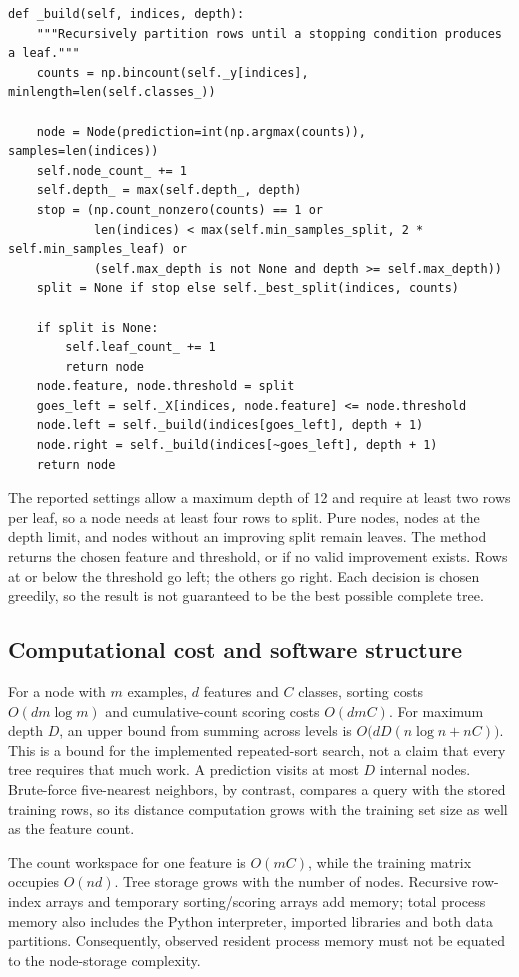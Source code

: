 \documentclass[11pt,letterpaper]{article}
\newcommand{\code}[1]{\texttt{\detokenize{#1}}}
\begin{document}
\begingroup\scriptsize
\begin{verbatim}
def _build(self, indices, depth):
    """Recursively partition rows until a stopping condition produces a leaf."""
    counts = np.bincount(self._y[indices], minlength=len(self.classes_))
    
    node = Node(prediction=int(np.argmax(counts)), samples=len(indices))
    self.node_count_ += 1
    self.depth_ = max(self.depth_, depth)
    stop = (np.count_nonzero(counts) == 1 or
            len(indices) < max(self.min_samples_split, 2 * self.min_samples_leaf) or
            (self.max_depth is not None and depth >= self.max_depth))
    split = None if stop else self._best_split(indices, counts)
    
    if split is None:
        self.leaf_count_ += 1
        return node
    node.feature, node.threshold = split
    goes_left = self._X[indices, node.feature] <= node.threshold
    node.left = self._build(indices[goes_left], depth + 1)
    node.right = self._build(indices[~goes_left], depth + 1)
    return node
\end{verbatim}
\endgroup

The reported settings allow a maximum depth of 12 and require at least two
rows per leaf, so a node needs at least four rows to split. Pure nodes,
nodes at the depth limit, and nodes without an improving split remain leaves.
The \code{_best_split} method returns the chosen feature and threshold, or
\code{None} if no valid improvement exists. Rows at or below the threshold
go left; the others go right. Each decision is chosen greedily, so the
result is not guaranteed to be the best possible complete tree.

\subsection{Computational cost and software structure}
For a node with $m$ examples, $d$ features and $C$ classes, sorting costs
$O(dm\log m)$ and cumulative-count scoring costs $O(dmC)$. For maximum depth
$D$, an upper bound from summing across levels is
$O\bigl(dD(n\log n+nC)\bigr)$. This is a bound for the implemented repeated-sort
search, not a claim that every tree requires that much work. A prediction visits
at most $D$ internal nodes. Brute-force five-nearest neighbors, by contrast, compares a query with
the stored training rows, so its distance computation grows with the training
set size as well as the feature count.

The count workspace for one feature is $O(mC)$, while the training matrix occupies
$O(nd)$. Tree storage grows with the number of nodes. Recursive row-index arrays
and temporary sorting/scoring arrays add memory; total process memory also includes the
Python interpreter, imported libraries and both data partitions. Consequently,
observed resident process memory must not be equated to the node-storage complexity.
\end{document}
